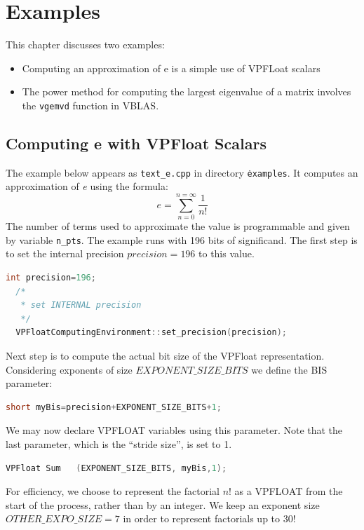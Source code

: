 \documentclass[11pt]{report}
\begin{document}
\chapter{Examples}\label{examples}

This chapter discusses two examples:
\begin{itemize}
\item Computing an approximation of e is a simple use of VPFLoat scalars
  \item The power method for computing the largest eigenvalue of a matrix involves the \texttt{vgemvd} function in VBLAS.
\end{itemize}
\section{Computing e with VPFloat Scalars}
The example below appears as \texttt{text\_e.cpp} in directory \texttt{\.\/examples}. It computes an approximation of \emph{e} using the formula:
\begin{equation}
  e=\sum_{n=0}^{n=\infty} \frac{1}{n!}
\end{equation}
The  number of terms used to approximate the value is programmable and given by variable \texttt{n\_pts}.
The example runs with 196 bits of significand. The first step is to set the internal precision $precision=196$ to this value.
\begin{lstlisting}[language=C, caption = {VPFLoat example}]
    int precision=196;  
  /* 
   * set INTERNAL precision
   */
  VPFloatComputingEnvironment::set_precision(precision);  
\end{lstlisting}
Next step is to compute the actual bit size of the VPFloat representation. Considering exponents of size $EXPONENT\_SIZE\_BITS$ we define the BIS parameter:

\begin{lstlisting}[language=C, caption = {VPFLoat example}]
  short myBis=precision+EXPONENT_SIZE_BITS+1;
\end{lstlisting}

We may now declare VPFLOAT variables using this parameter. Note that the last parameter, which is the ``stride size'', is set to 1. 

\begin{lstlisting}[language=C, caption = {VPFLoat example}]
  VPFloat Sum   (EXPONENT_SIZE_BITS, myBis,1);
\end{lstlisting}

For efficiency, we choose to represent the factorial $n!$ as a VPFLOAT from the start of the process, rather than by an integer.
We keep an exponent size $OTHER\_EXPO\_SIZE=7$ in order to represent factorials up to $30!$ 
\end{document}
